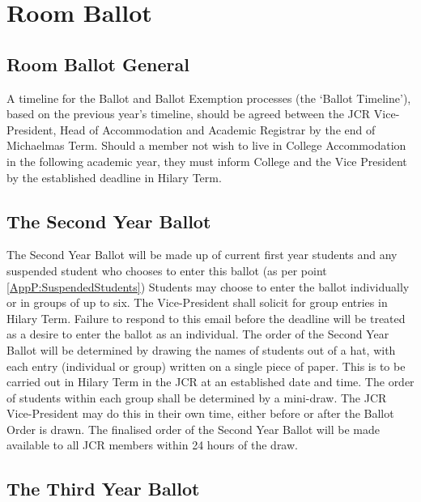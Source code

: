\chapter{Room Ballot}\label{App:RoomBallot}

\section{Room Ballot General}

\npara A timeline for the Ballot and Ballot Exemption processes (the ‘Ballot Timeline’), based on the previous year’s timeline, should be agreed between the JCR Vice-President, Head of Accommodation and Academic Registrar by the end of Michaelmas Term.  
\npara Should a member not wish to live in College Accommodation in the following academic year, they must inform College and the Vice President by the established deadline in Hilary Term.

\section{The Second Year Ballot}

\npara The Second Year Ballot will be made up of current first year students and any suspended student who chooses to enter this ballot (as per point \ref{AppP:SuspendedStudents})
\npara Students may choose to enter the ballot individually or in groups of up to six. The Vice-President shall solicit for group entries in Hilary Term. Failure to respond to this email before the deadline will be treated as a desire to enter the ballot as an individual.
\npara The order of the Second Year Ballot will be determined by drawing the names of students out of a hat, with each entry (individual or group) written on a single piece of paper. This is to be carried out in Hilary Term in the JCR at an established date and time. The order of students within each group shall be determined by a mini-draw. The JCR Vice-President may do this in their own time, either before or after the Ballot Order is drawn.
\npara The finalised order of the Second Year Ballot will be made available to all JCR members within 24 hours of the draw.

\section{The Third Year Ballot}

